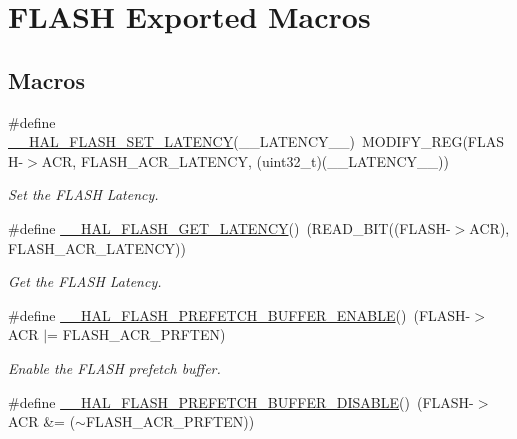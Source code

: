 \hypertarget{group___f_l_a_s_h___exported___macros}{}\section{F\+L\+A\+SH Exported Macros}
\label{group___f_l_a_s_h___exported___macros}
\subsection*{Macros}
\begin{DoxyCompactItemize}
\item 
\#define \mbox{\hyperlink{group___f_l_a_s_h___exported___macros_gac1c9f459b798cc3700b90a6245df5a1a}{\+\_\+\+\_\+\+H\+A\+L\+\_\+\+F\+L\+A\+S\+H\+\_\+\+S\+E\+T\+\_\+\+L\+A\+T\+E\+N\+CY}}(\+\_\+\+\_\+\+L\+A\+T\+E\+N\+C\+Y\+\_\+\+\_\+)~M\+O\+D\+I\+F\+Y\+\_\+\+R\+EG(F\+L\+A\+SH-\/$>$A\+CR, F\+L\+A\+S\+H\+\_\+\+A\+C\+R\+\_\+\+L\+A\+T\+E\+N\+CY, (uint32\+\_\+t)(\+\_\+\+\_\+\+L\+A\+T\+E\+N\+C\+Y\+\_\+\+\_\+))
\begin{DoxyCompactList}\small\item\em Set the F\+L\+A\+SH Latency. \end{DoxyCompactList}\item 
\#define \mbox{\hyperlink{group___f_l_a_s_h___exported___macros_gaa537e44d74ce35ff5bfef80edf03f895}{\+\_\+\+\_\+\+H\+A\+L\+\_\+\+F\+L\+A\+S\+H\+\_\+\+G\+E\+T\+\_\+\+L\+A\+T\+E\+N\+CY}}()~(R\+E\+A\+D\+\_\+\+B\+IT((F\+L\+A\+SH-\/$>$A\+CR), F\+L\+A\+S\+H\+\_\+\+A\+C\+R\+\_\+\+L\+A\+T\+E\+N\+CY))
\begin{DoxyCompactList}\small\item\em Get the F\+L\+A\+SH Latency. \end{DoxyCompactList}\item 
\#define \mbox{\hyperlink{group___f_l_a_s_h___exported___macros_gad36059641057f824516303ea92734e6f}{\+\_\+\+\_\+\+H\+A\+L\+\_\+\+F\+L\+A\+S\+H\+\_\+\+P\+R\+E\+F\+E\+T\+C\+H\+\_\+\+B\+U\+F\+F\+E\+R\+\_\+\+E\+N\+A\+B\+LE}}()~(F\+L\+A\+SH-\/$>$A\+CR $\vert$= F\+L\+A\+S\+H\+\_\+\+A\+C\+R\+\_\+\+P\+R\+F\+T\+EN)
\begin{DoxyCompactList}\small\item\em Enable the F\+L\+A\+SH prefetch buffer. \end{DoxyCompactList}\item 
\#define \mbox{\hyperlink{group___f_l_a_s_h___exported___macros_ga646a4cb92e85659334d14a8c78f0ede8}{\+\_\+\+\_\+\+H\+A\+L\+\_\+\+F\+L\+A\+S\+H\+\_\+\+P\+R\+E\+F\+E\+T\+C\+H\+\_\+\+B\+U\+F\+F\+E\+R\+\_\+\+D\+I\+S\+A\+B\+LE}}()~(F\+L\+A\+SH-\/$>$A\+CR \&= ($\sim$F\+L\+A\+S\+H\+\_\+\+A\+C\+R\+\_\+\+P\+R\+F\+T\+EN))

\end{DoxyCompactItemize}
